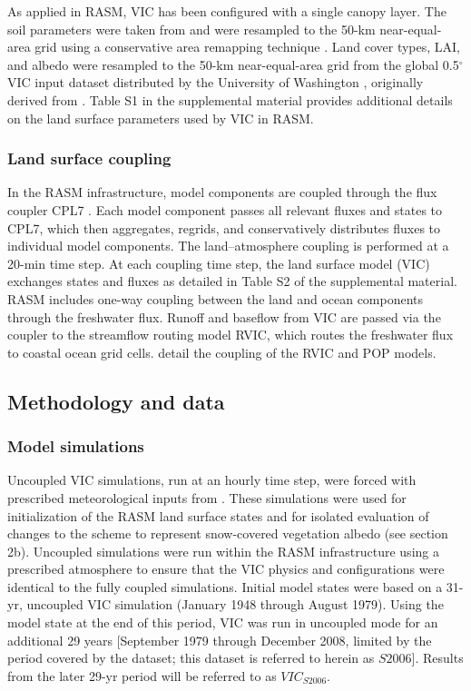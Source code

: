 As applied in RASM, VIC has been configured with a single canopy layer.
The soil parameters were taken from \citet{Sheffield_2006} and were resampled to the 50-km near-equal-area grid using a conservative area remapping technique \citep{Jones_1999}.
Land cover types, LAI, and albedo were resampled to the 50-km near-equal-area grid from the global 0.5$^{\circ}$ VIC input dataset distributed by the University of Washington \citep{Su_2005}, originally derived from \citet{Hansen_2000}.
Table S1 in the supplemental material provides additional details on the land surface parameters used by VIC in RASM.

\subsubsection{Land surface coupling}

In the RASM infrastructure, model components are coupled through the flux coupler CPL7 \citep{Craig_2012}.
Each model component passes all relevant fluxes and states to CPL7, which then aggregates, regrids, and conservatively distributes fluxes to individual model components.
The land–atmosphere coupling is performed at a 20-min time step.
At each coupling time step, the land surface model (VIC) exchanges states and fluxes as detailed in Table S2 of the supplemental material.
RASM includes one-way coupling between the land and ocean components through the freshwater flux.
Runoff and baseflow from VIC are passed via the coupler to the streamflow routing model RVIC, which routes the freshwater flux to coastal ocean grid cells.
\citet{Hamman_2016b} detail the coupling of the RVIC and POP models.

\subsection{Methodology and data}
\label{sec:data_ch3}

\subsubsection{Model simulations}

Uncoupled VIC simulations, run at an hourly time step, were forced with prescribed meteorological inputs from \citet{Sheffield_2006}.
These simulations were used for initialization of the RASM land surface states and for isolated evaluation of changes to the scheme to represent snow-covered vegetation albedo (see section 2b).
Uncoupled simulations were run within the RASM infrastructure using a prescribed atmosphere to ensure that the VIC physics and configurations were identical to the fully coupled simulations.
Initial model states were based on a 31-yr, uncoupled VIC simulation (January 1948 through August 1979).
Using the model state at the end of this period, VIC was run in uncoupled mode for an additional 29 years [September 1979 through December 2008, limited by the period covered by the \citet{Sheffield_2006} dataset; this dataset is referred to herein as $S2006$].
Results from the later 29-yr period will be referred to as $VIC_{S2006}$.

